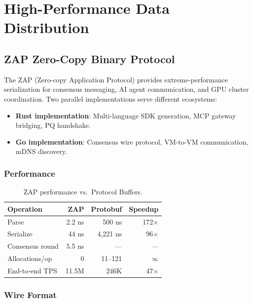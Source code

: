 \documentclass[11pt,letterpaper]{article}
\begin{document}
\section{High-Performance Data Distribution}

\subsection{ZAP Zero-Copy Binary Protocol}

The ZAP (Zero-copy Application Protocol) provides extreme-performance serialization for consensus messaging, AI agent communication, and GPU cluster coordination. Two parallel implementations serve different ecosystems:

\begin{itemize}
\item \textbf{Rust implementation}: Multi-language SDK generation, MCP gateway bridging, PQ handshake.
\item \textbf{Go implementation}: Consensus wire protocol, VM-to-VM communication, mDNS discovery.
\end{itemize}

\subsubsection{Performance}

\begin{table}[H]
\centering
\begin{tabular}{@{}lrrr@{}}
\toprule
\textbf{Operation} & \textbf{ZAP} & \textbf{Protobuf} & \textbf{Speedup} \\
\midrule
Parse & 2.2 ns & 500 ns & 172$\times$ \\
Serialize & 44 ns & 4,221 ns & 96$\times$ \\
Consensus round & 5.5 ns & --- & --- \\
Allocations/op & 0 & 11--121 & $\infty$ \\
End-to-end TPS & 11.5M & 246K & 47$\times$ \\
\bottomrule
\end{tabular}
\caption{ZAP performance vs.\ Protocol Buffers.}
\label{tab:zap}
\end{table}

\subsubsection{Wire Format}
\end{document}
